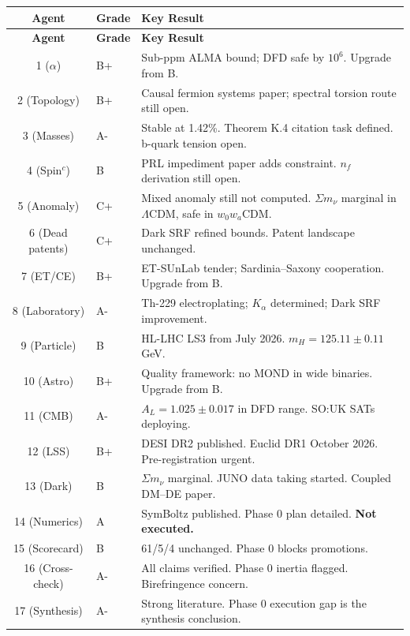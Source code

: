 \documentclass[11pt,a4paper]{article}
\begin{document}
\begin{center}
\begin{longtable}{clp{9cm}}
\toprule
\textbf{Agent} & \textbf{Grade} & \textbf{Key Result} \\
\midrule
\endfirsthead
\toprule
\textbf{Agent} & \textbf{Grade} & \textbf{Key Result} \\
\midrule
\endhead
1 ($\alpha$) & B+ & Sub-ppm ALMA bound; DFD safe by $10^6$. Upgrade from B. \\
2 (Topology) & B+ & Causal fermion systems paper; spectral torsion route still open. \\
3 (Masses) & A- & Stable at 1.42\%. Theorem K.4 citation task defined. b-quark tension open. \\
4 (Spin$^c$) & B & PRL impediment paper adds constraint. $n_f$ derivation still open. \\
5 (Anomaly) & C+ & Mixed anomaly still not computed. $\Sigma m_\nu$ marginal in $\Lambda$CDM, safe in $w_0 w_a$CDM. \\
6 (Dead patents) & C+ & Dark SRF refined bounds. Patent landscape unchanged. \\
7 (ET/CE) & B+ & ET-SUnLab tender; Sardinia--Saxony cooperation. Upgrade from B. \\
8 (Laboratory) & A- & Th-229 electroplating; $K_\alpha$ determined; Dark SRF improvement. \\
9 (Particle) & B & HL-LHC LS3 from July 2026. $m_H = 125.11 \pm 0.11$ GeV. \\
10 (Astro) & B+ & Quality framework: no MOND in wide binaries. Upgrade from B. \\
11 (CMB) & A- & $A_L = 1.025 \pm 0.017$ in DFD range. SO:UK SATs deploying. \\
12 (LSS) & B+ & DESI DR2 published. Euclid DR1 October 2026. Pre-registration urgent. \\
13 (Dark) & B & $\Sigma m_\nu$ marginal. JUNO data taking started. Coupled DM--DE paper. \\
14 (Numerics) & A & SymBoltz published. Phase 0 plan detailed. \textbf{Not executed.} \\
15 (Scorecard) & B & 61/5/4 unchanged. Phase 0 blocks promotions. \\
16 (Cross-check) & A- & All claims verified. Phase 0 inertia flagged. Birefringence concern. \\
17 (Synthesis) & A- & Strong literature. Phase 0 execution gap is the synthesis conclusion. \\
\bottomrule
\end{longtable}
\end{center}
\end{document}
